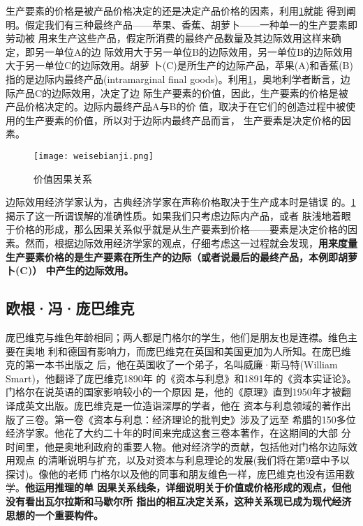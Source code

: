 生产要素的价格是被产品价格决定的还是决定产品价格的因素，利用\cref{fig:weise}就能
得到阐明。假定我们有三种最终产品——苹果、香蕉、胡萝卜——一种单一的生产要素即劳动被
用来生产这些产品，假定所消费的最终产品数量及其边际效用这样来确定，即另一单位A的边
际效用大于另一单位B的边际效用，另一单位B的边际效用大于另一单位C的边际效用。胡萝
卜(C)是所生产的边际产品，苹果(A)和香蕉(B)指的是边际内最终产品(intramarginal
final goods)。利用\cref{fig:weise}，奥地利学者断言，边际产品C的边际效用，决定了边
际生产要素的价值，因此，生产要素的价格是被产品价格决定的。边际内最终产品A与B的价
值，取决于在它们的创造过程中被使用的生产要素的价值，所以对于边际内最终产品而言，
生产要素是决定价格的因素。
\begin{figure}[ht]
  \centering
  \texttt{[image: weisebianji.png]}
  \caption{\label{fig:weise}价值因果关系}
\end{figure}

边际效用经济学家认为，古典经济学家在声称价格取决于生产成本时是错误
的。\cref{fig:weise}揭示了这一所谓误解的准确性质。如果我们只考虑边际内产品，或者
肤浅地着眼于价格的形成，那么因果关系似乎就是从生产要素到价格——要素是决定价格的因
素。然而，根据边际效用经济学家的观点，仔细考虑这一过程就会发现，\textbf{用来度量
  生产要素价格的是生产要素在所生产的边际（或者说最后的最终产品，本例即胡萝卜(C)）
  中产生的边际效用。}

\subsection{欧根·冯·庞巴维克}

庞巴维克与维色年龄相同；两人都是门格尔的学生，他们是朋友也是连襟。维色主要在奥地
利和德国有影响力，而庞巴维克在英国和美国更加为人所知。在庞巴维克的第一本书出版之
后，他在英国收了一个弟子，名叫威廉·斯马特(William Smart)，他翻译了庞巴维克1890年
的《资本与利息》和1891年的《资本实证论》。门格尔在说英语的国家影响较小的一个原因
是，他的《原理》直到1950年才被翻译成英文出版。庞巴维克是一位造诣深厚的学者，他在
资本与利息领域的著作出版了三卷。第一卷《资本与利息：经济理论的批判史》涉及了远至
希腊的150多位经济学家。他花了大约二十年的时间来完成这套三卷本著作，在这期间的大部
分时间里，他是奥地利政府的重要人物。他对经济学的贡献，包括他对门格尔边际效用观点
的清晰说明与扩充，以及对资本与利息理论的发展(我们将在第9章中予以探讨)。像他的老师
门格尔以及他的同事和朋友维色一样，庞巴维克也没有运用数学。\textbf{他运用推理的单
  因果关系线条，详细说明关于价值或价格形成的观点，但他没有看出瓦尔拉斯和马歇尔所
  指出的相互决定关系，这种关系现已成为现代经济思想的一个重要构件。}

